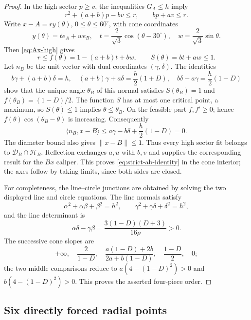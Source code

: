 \begin{proof}
In the high sector $p\ge v$, the inequalities $G_A\le h$ imply
\begin{equation}
 r^2+(a+b)p-bv\le r,\qquad bp+av\le r.          \label{eq:Ax-high}
\end{equation}
Write $x-A=ry(\theta)$, $0\le\theta\le60^\circ$, with cone coordinates
\[
 y(\theta)=te_A+we_B,\quad
 t=\frac2{\sqrt3}\cos(\theta-30^\circ),\quad
 w=\frac2{\sqrt3}\sin\theta.
\]
Then \eqref{eq:Ax-high} gives
\[
 r\le f(\theta)=1-(a+b)t+bw,\qquad S(\theta)=bt+aw\le1.
\]
Let $n_B$ be the unit vector with dual coordinates $(\gamma,\delta)$.
The identities
\[
 b\gamma+(a+b)\delta=h,\quad
 (a+b)\gamma+a\delta=\frac h2(1+D),\quad
 b\delta-a\gamma=\frac h2(1-D)
\]
show that the unique angle $\theta_B$ of this normal satisfies
$S(\theta_B)=1$ and $f(\theta_B)=(1-D)/2$.  The function $S$ has at most
one critical point, a maximum, so $S(\theta)\le1$ implies
$\theta\le\theta_B$.  On the feasible part $f,f'\ge0$; hence
$f(\theta)\cos(\theta_B-\theta)$ is increasing.  Consequently
\[
 \langle n_B,x-B\rangle
 \le a\gamma-b\delta+\frac h2(1-D)=0.
\]
The diameter bound also gives $\lVert x-B\rVert\le1$.  Thus every high
sector fit belongs to $\mathcal D_B\cap\mathcal H_B$.  Reflection exchanges
$a,u$ with $b,v$ and supplies the corresponding result for the $Bx$
caliper.  This proves \eqref{eq:strict-ab-identity} in the cone interior;
the axes follow by taking limits, since both sides are closed.

For completeness, the line--circle junctions are obtained by solving the
two displayed line and circle equations.  The line normals satisfy
\[
 \alpha^2+\alpha\beta+\beta^2=h^2,\qquad
 \gamma^2+\gamma\delta+\delta^2=h^2,
\]
and the line determinant is
\[
 \alpha\delta-\gamma\beta
 =\frac{3(1-D)(D+3)}{16\rho}>0.
\]
The successive cone slopes are
\[
 +\infty,\quad \frac2{1-D},\quad
 \frac{a(1-D)+2b}{2a+b(1-D)},\quad
 \frac{1-D}{2},\quad0;
\]
the two middle comparisons reduce to
$a(4-(1-D)^2)>0$ and $b(4-(1-D)^2)>0$.  This proves the asserted four-piece
order.
\end{proof}


\subsection{Six directly forced radial points}

